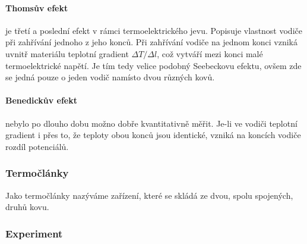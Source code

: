 \paragraph{Thomsův efekt} je třetí a poslední efekt v rámci termoelektrického
jevu.  Popisuje vlastnost vodiče při zahřívání jednoho z jeho konců. Při
zahřívání vodiče na jednom konci vzniká uvnitř materiálu teplotní gradient
$\Delta T/\Delta l$, což vytváří mezi konci malé termoelektrické napětí. Je tím
tedy velice podobný Seebeckovu efektu, ovšem zde se jedná pouze o jeden vodič
namísto dvou různých kovů.~\cite{jreichl-thomson}

\paragraph{Benedickův efekt} nebylo po dlouho dobu možno dobře kvantitativně
měřit.  Je-li ve vodiči teplotní gradient i přes to, že teploty obou konců jsou
identické, vzniká na koncích vodiče rozdíl potenciálů.~\cite{diplomka}

\subsubsection{Termočlánky}
Jako termočlánky nazýváme zařízení, které se skládá ze dvou, spolu spojených,
druhů kovu. 


\subsubsection{Experiment}
